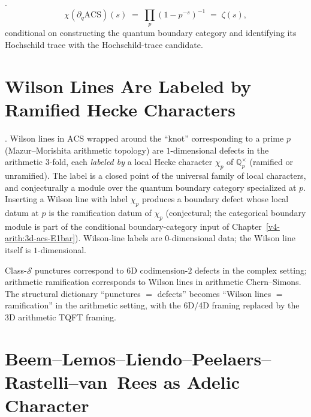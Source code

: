 \begin{corollary}[character = \(\zeta\)]
\label{v4-arith:cor:character-is-zeta}
\ClaimStatusConjectured.
\begin{equation}
\chi(\partial_{q}\mathrm{ACS})(s)\;=\;\prod_{p}(1-p^{-s})^{-1}\;=\;\zeta(s),
\end{equation}
conditional on constructing the quantum boundary category and
identifying its Hochschild trace with the Hochschild-trace candidate.
\end{corollary}

\section{Wilson Lines Are Labeled by Ramified Hecke Characters}
\label{v4-arith:ga:wilson-lines}

\begin{theorem}
\label{v4-arith:thm:wilson-hecke}
\ClaimStatusConjectured. Wilson lines in \(\mathrm{ACS}\) wrapped
around the ``knot'' corresponding to a prime \(p\) (Mazur--Morishita
arithmetic topology) are \(1\)-dimensional defects in the arithmetic
\(3\)-fold, each \emph{labeled by} a local Hecke character \(\chi_{p}\)
of \(\mathbb{Q}_{p}^{\times}\) (ramified or unramified). The label
is a closed point of the universal family of local characters,
and conjecturally a module over the quantum boundary category
specialized at \(p\). Inserting a Wilson line with label \(\chi_{p}\)
produces a boundary defect whose local datum at \(p\) is the
ramification datum of \(\chi_{p}\) (conjectural; the categorical
boundary module is part of the conditional boundary-category input of
Chapter~\ref{v4-arith:3d-acs-E1bar}).
Wilson-line labels are \(0\)-dimensional data; the Wilson line itself
is \(1\)-dimensional.
\end{theorem}

\begin{remark}
Class-\(\mathcal{S}\) punctures correspond to 6D codimension-\(2\)
defects in the complex setting; arithmetic ramification corresponds
to Wilson lines in arithmetic Chern--Simons. The structural
dictionary ``punctures \(=\) defects'' becomes
``Wilson lines \(=\) ramification'' in the arithmetic setting,
with the 6D/4D framing replaced by the 3D arithmetic TQFT framing.
\end{remark}

\section{Beem--Lemos--Liendo--Peelaers--Rastelli--van~Rees as Adelic Character}
\label{v4-arith:ga:BLLPRvR-adelic}

